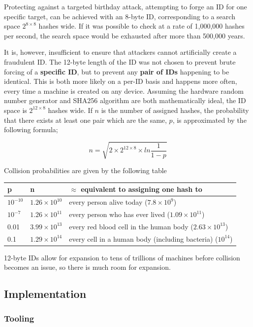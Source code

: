 \documentclass{article}
\begin{document}
Protecting against a targeted birthday attack, attempting to forge an ID for one specific target, can be achieved with an 8-byte ID, corresponding to a search space \( 2^{8 \times 8} \) hashes wide. If it was possible to check at a rate of 1,000,000 hashes per second, the search space would be exhausted after more than 500,000 years.

It is, however, insufficient to ensure that attackers cannot artificially create a fraudulent ID. The 12-byte length of the ID was not chosen to prevent brute forcing of a \textbf{specific ID}, but to prevent any \textbf{pair of IDs} happening to be identical. This is both more likely on a per-ID basis and happens more often, every time a machine is created on any device. Assuming the hardware random number generator and SHA256 algorithm are both mathematically ideal, the ID space is \( 2^{12 \times 8} \) hashes wide. If \( n \) is the number of assigned hashes, the probability that there exists at least one pair which are the same, \( p \), is approximated by the following formula\cite{birth};

\[ n = \sqrt{2 \times 2^{12 \times 8} \times ln\frac{1}{1-p}}\]

Collision probabilities are given by the following table
\begin{table}[H]
\begin{tabular}{l|l|l}
p				&n							&\( \approx \) equivalent to assigning one hash to \\ \hline
\( 10^{-10}\)	&\( 1.26 \times 10^{10}\)	& every person alive today (\( 7.8 \times 10^{9}\))\\
\( 10^{-7}\)	&\( 1.26 \times 10^{11}\)	& every person who has ever lived (\( 1.09 \times 10^{11}\)) \\
0.01			&\( 3.99 \times 10^{13}\)	& every red blood cell in the human body (\( 2.63 \times 10^{13}\)) \\
0.1				&\( 1.29 \times 10^{14}\)	& every cell in a human body (including bacteria) (\( 10^{14}\))

\end{tabular}
\end{table}

12-byte IDs allow for expansion to tens of trillions of machines before collision becomes an issue, so there is much room for expansion.

\subsection{Implementation}
\subsubsection{Tooling}
\end{document}
